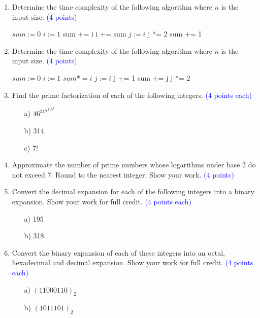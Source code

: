 \documentclass{article}
\newcommand{\pt}[1]{\textcolor{blue}{(#1 points)}}
\newcommand{\pte}[1]{\textcolor{blue}{(#1 points each)}}
\begin{document}
\begin{enumerate}

    \item
    {Determine the time complexity of the following algorithm where $n$ is the input size.} \pt{4}
    \begin{algorithmic}
    \State $sum := 0$
    \State $i:=1$
        \State sum += i
        \State i += sum
        \EndWhile
    \State $j := i$
        \State j *= 2
        \State sum += 1
        \EndWhile
    \end{algorithmic}
    
    \item
    {Determine the time complexity of the following algorithm where $n$ is the input size.} \pt{4}
    \begin{algorithmic}
    \State $sum := 0$
    \State $i:=1$
        \State $sum *= i$
    \EndFor
    \State $j := i$
        \State j += 1
        \State sum += j
        \State j *= 2
    \EndWhile
    \end{algorithmic}

    \item Find the prime factorization of each of the following integers. \pte{4}
\begin{enumerate}
    \item[a)] $46^317^415^2$
    \item[b)] 314
    \item[c)] 7!
\end{enumerate}

    \item Approximate the number of prime numbers whose logarithms under base 2 do not exceed 7. Round to the nearest integer. Show your work. \pt{4}

    \item Convert the decimal expansion for each of the following integers into a binary expansion. Show your work for full credit. \pte{4}
\begin{enumerate}
    \item[a)] 195
    \item[b)] 318
\end{enumerate}

    \item Convert the binary expansion of each of these integers into an octal, hexadecimal and decimal expansion. Show your work for full credit. \pte{4}
\begin{enumerate}
    \item[a)] $(11000110)_2$
    \item[b)] $(1011101)_2$
\end{enumerate}


\end{enumerate}
\end{document}

